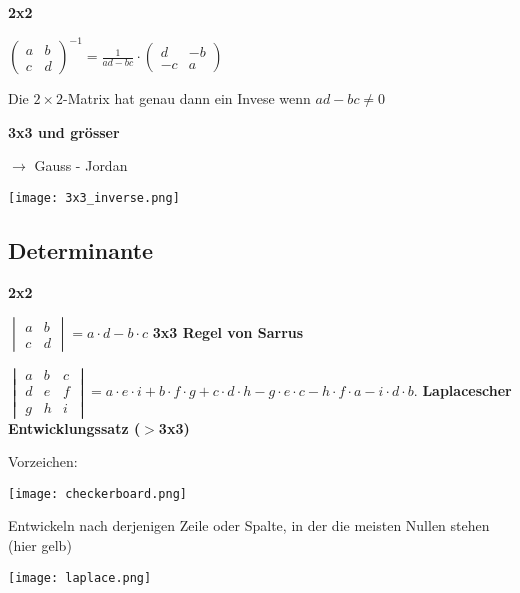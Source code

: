 \begin{multicols*}{3}
    \textbf{2x2}

    {\large$\begin{pmatrix}
            a & b \\
            c & d
        \end{pmatrix}^{-1} = \frac{1}{ad-bc}\cdot\begin{pmatrix}
            d  & -b \\
            -c & a
        \end{pmatrix}$}

    {Die $2\times2$-Matrix hat genau dann ein Invese wenn $ad-bc \neq 0$}

    \textbf{3x3 und grösser}

    {$\rightarrow$ Gauss - Jordan}

    \texttt{[image: 3x3\_inverse.png]}
    \WhiteSpace

    \subsection{Determinante}
    {\textbf{2x2}}

    $\begin{vmatrix}
            a & b \\
            c & d
        \end{vmatrix} = a\cdot d - b\cdot c $
    \WhiteSpace
    \textbf{3x3 Regel von Sarrus}

    $\begin{vmatrix} a & b & c \\ d & e & f \\ g & h &i \end{vmatrix} = a \cdot e \cdot i + b \cdot f \cdot g + c \cdot d \cdot h - g \cdot e \cdot c - h \cdot f \cdot a - i \cdot d \cdot b.$
    \WhiteSpace
    \textbf{Laplacescher Entwicklungssatz ($ >$3x3)}

    {\begin{multicols}{2}
            Vorzeichen:

            \columnbreak
            { \texttt{[image: checkerboard.png]} }

        \end{multicols}}

    {\small{Entwickeln nach derjenigen Zeile oder Spalte, in
            der die meisten Nullen stehen (hier gelb)}}
    {\begin{multicols}{2}
            {\texttt{[image: laplace.png]}}
            \columnbreak


\end{multicols}}
\end{multicols*}
